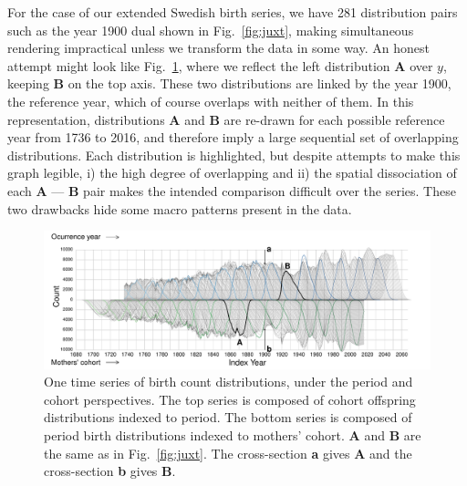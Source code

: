 For the case of our extended Swedish birth series, we have 281 distribution pairs such as the year 1900 dual shown in Fig.~\ref{fig:juxt}, making simultaneous rendering impractical unless we transform the data in some way. An honest attempt might look like Fig.~\ref{fig:reflect1}, where we reflect the left distribution \textbf{A} over $y$, keeping \textbf{B} on the top axis. These two distributions are linked by the year 1900, the reference year, which of course overlaps with neither of them. In this representation, distributions \textbf{A} and \textbf{B} are re-drawn for each possible reference year from 1736 to 2016, and therefore imply a large sequential set of overlapping distributions. Each  distribution is highlighted, but despite attempts to make this graph legible, i) the high degree of overlapping and ii) the spatial dissociation of each \textbf{A} --- \textbf{B} pair makes the intended comparison difficult over the series. These two drawbacks hide some macro patterns present in the data.

\begin{figure}[ht!]
 \centering
        \includegraphics[width=\textwidth]{Figures/FxFlowReflect.pdf}
        \caption{One time series of birth count distributions, under the period and cohort perspectives. The top series is composed of cohort offspring distributions indexed to period. The bottom series is composed of period birth distributions indexed to mothers' cohort. \textbf{A} and \textbf{B} are the same as in Fig.~\ref{fig:juxt}. The cross-section \textbf{a} gives \textbf{A} and the cross-section \textbf{b} gives \textbf{B}.}
          \label{fig:reflect1}
\end{figure}

